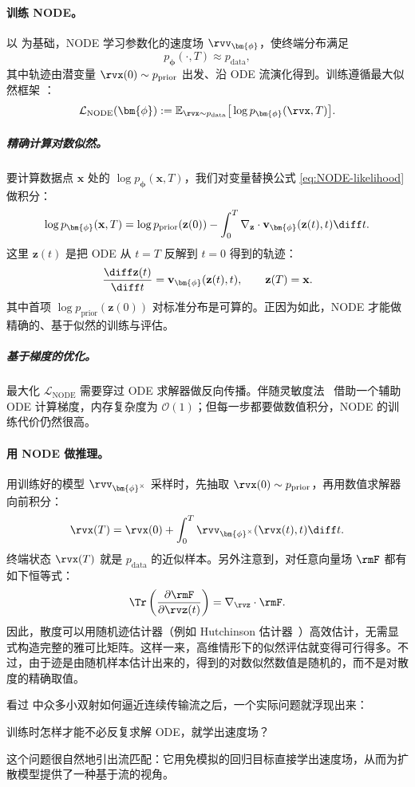 \paragraph{训练 NODE。}
以  为基础，NODE 学习参数化的速度场 $\rvv_{\bm{\phi}}$，使终端分布满足
\[
p_{\bm{\phi}}(\cdot, T) \approx p_{\text{data}},
\]
其中轨迹由潜变量 $\rvx(0) \sim p_{\text{prior}}$ 出发、沿 ODE 流演化得到。训练遵循最大似然框架 ：
\[
\mathcal{L}_{\text{NODE}}(\bm{\phi}) := \mathbb{E}_{\rvx \sim p_{\text{data}}} \big[\log p_{\bm{\phi}}(\rvx, T)\big].
\]

\subparagraph{精确计算对数似然。}
要计算数据点 $\mathbf{x}$ 处的 $\log p_{\bm{\phi}}(\mathbf{x}, T)$，我们对变量替换公式 \eqref{eq:NODE-likelihood} 做积分：
\begin{align}
\log p_{\bm{\phi}}(\mathbf{x}, T) = \log p_{\text{prior}}(\mathbf{z}(0)) - \int_0^T \nabla_{\mathbf{z}} \cdot \mathbf{v}_{\bm{\phi}}(\mathbf{z}(t), t) \diff t.
\end{align}
这里 $\mathbf{z}(t)$ 是把 ODE 从 $t = T$ 反解到 $t = 0$ 得到的轨迹：
\[
\frac{\diff\mathbf{z}(t)}{\diff t} = \mathbf{v}_{\bm{\phi}}(\mathbf{z}(t), t),
\qquad
\mathbf{z}(T) = \mathbf{x}.
\]
其中首项 $\log p_{\text{prior}}(\mathbf{z}(0))$ 对标准分布是可算的。正因为如此，NODE 才能做精确的、基于似然的训练与评估。

\subparagraph{基于梯度的优化。}
最大化 $\mathcal{L}_{\text{NODE}}$ 需要穿过 ODE 求解器做反向传播。伴随灵敏度法~\citep{pontryagin2018mathematical, chen2018neural} 借助一个辅助 ODE 计算梯度，内存复杂度为 $\mathcal{O}(1)$；但每一步都要做数值积分，NODE 的训练代价仍然很高。

\paragraph{用 NODE 做推理。}
用训练好的模型 $\rvv_{\bm{\phi}^\times}$ 采样时，先抽取 $\rvx(0) \sim p_{\text{prior}}$，再用数值求解器向前积分：
\[
\rvx(T) = \rvx(0) + \int_0^T \rvv_{\bm{\phi}^\times}(\rvx(t), t)   \diff t.
\]
终端状态 $\rvx(T)$ 就是 $p_{\text{data}}$ 的近似样本。另外注意到，对任意向量场 $\rmF$ 都有如下恒等式：
\[
    \Tr\left(\frac{\partial \rmF}{\partial \rvz(t)} \right) = \nabla_{\rvz} \cdot \rmF.
\]
因此，散度可以用随机迹估计器（例如 Hutchinson 估计器~\citep{hutchinson1989stochastic}）高效估计，无需显式构造完整的雅可比矩阵。这样一来，高维情形下的似然评估就变得可行得多。不过，由于迹是由随机样本估计出来的，得到的对数似然数值是随机的，而不是对散度的精确取值。

看过  中众多小双射如何逼近连续传输流之后，一个实际问题就浮现出来：
\begin{question}
    训练时怎样才能不必反复求解 ODE，就学出速度场？
\end{question}
这个问题很自然地引出流匹配：它用免模拟的回归目标直接学出速度场，从而为扩散模型提供了一种基于流的视角。


